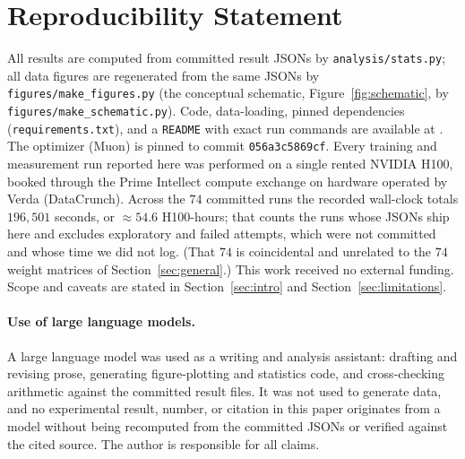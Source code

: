 \section*{Reproducibility Statement}
All results are computed from committed result JSONs by \texttt{analysis/stats.py}; all
data figures are regenerated from the same JSONs by \texttt{figures/make\_figures.py}
(the conceptual schematic, Figure~\ref{fig:schematic}, by \texttt{figures/make\_schematic.py}).
Code, data-loading, pinned dependencies (\texttt{requirements.txt}), and a
\texttt{README} with exact run commands are available at
\repourl{}. The optimizer (Muon) is pinned to
commit \texttt{056a3c5869cf}. Every training and measurement run reported here was
performed on a single rented NVIDIA H100, booked through the Prime Intellect compute
exchange on hardware operated by Verda (DataCrunch). Across the $74$ committed runs the recorded
wall-clock totals $196{,}501$ seconds, or ${\approx}54.6$ H100-hours; that
counts the runs whose JSONs ship here and excludes exploratory and failed
attempts, which were not committed and whose time we did not log. (That $74$ is
coincidental and unrelated to the $74$ weight matrices of
Section~\ref{sec:general}.) This work received no external funding. Scope and caveats are stated in
Section~\ref{sec:intro} and Section~\ref{sec:limitations}.

\paragraph{Use of large language models.} A large language model was used as a
writing and analysis assistant: drafting and revising prose, generating
figure-plotting and statistics code, and cross-checking arithmetic against the
committed result files. It was not used to generate data, and no experimental
result, number, or citation in this paper originates from a model without being
recomputed from the committed JSONs or verified against the cited source. The
author is responsible for all claims.
